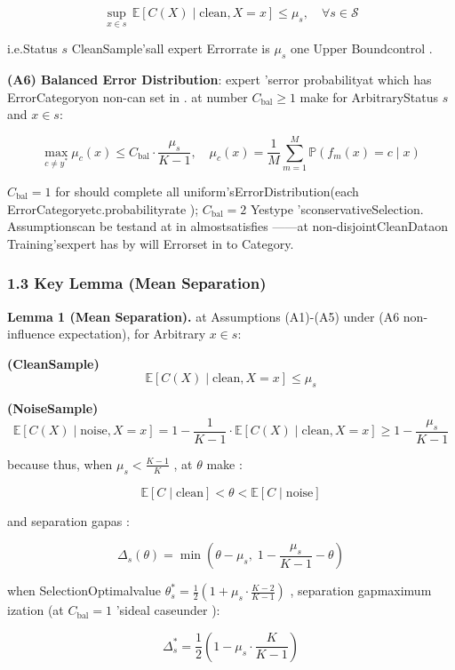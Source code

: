 \documentclass[
  12pt,
]{article}
\begin{document}
\[\sup_{x \in s} \, \mathbb{E}[C(X) \mid \text{clean}, X = x] \leq \mu_s, \quad \forall s \in \mathcal{S}\]

i.e.Status \(s\) CleanSample'sall expert Errorrate is  \(\mu_s\) one Upper Boundcontrol . 

\textbf{(A6) Balanced Error Distribution}:
expert 'serror probabilityat which has ErrorCategoryon non-can set in . at number 
\(C_{\text{bal}} \geq 1\) make for ArbitraryStatus \(s\) and  \(x \in s\): 

\[\max_{c \neq y^*} \mu_c(x) \leq C_{\text{bal}} \cdot \frac{\mu_s}{K-1}, \quad \mu_c(x) = \frac{1}{M} \sum_{m=1}^M \mathbb{P}(f_m(x) = c \mid x)\]

\(C_{\text{bal}} = 1\)
for should complete all uniform'sErrorDistribution(each ErrorCategoryetc.probabilityrate ); \(C_{\text{bal}} = 2\)
Yestype 'sconservativeSelection. Assumptionscan be testand at in almostsatisfies ------at non-disjointCleanDataon Training'sexpert has by will Errorset in to Category. 

\subsubsection{1.3 Key Lemma
(Mean Separation)}\label{ux5173ux952eux5f15ux7406-ux5747ux503cux5206ux79bb}

\textbf{Lemma 1 (Mean Separation).} at Assumptions (A1)-(A5) under (A6
non-influence expectation), for Arbitrary \(x \in s\): 

\textbf{(CleanSample)}
\[\mathbb{E}[C(X) \mid \text{clean}, X = x] \leq \mu_s\]

\textbf{(NoiseSample)}
\[\mathbb{E}[C(X) \mid \text{noise}, X = x] = 1 - \frac{1}{K-1} \cdot \mathbb{E}[C(X) \mid \text{clean}, X = x] \geq 1 - \frac{\mu_s}{K-1}\]

because thus, when  \(\mu_s < \frac{K-1}{K}\) , at  \(\theta\) make : 

\[\mathbb{E}[C \mid \text{clean}] < \theta < \mathbb{E}[C \mid \text{noise}]\]

and separation gapas : 

\[\Delta_s(\theta) = \min\left(\theta - \mu_s, \; 1 - \frac{\mu_s}{K-1} - \theta\right)\]

when SelectionOptimalvalue 
\(\theta_s^* = \frac{1}{2}\left(1 + \mu_s \cdot \frac{K-2}{K-1}\right)\)
, separation gapmaximum ization (at  \(C_{\text{bal}}=1\) 'sideal caseunder ):

\[\Delta_s^* = \frac{1}{2}\left(1 - \mu_s \cdot \frac{K}{K-1}\right)\]
\end{document}
